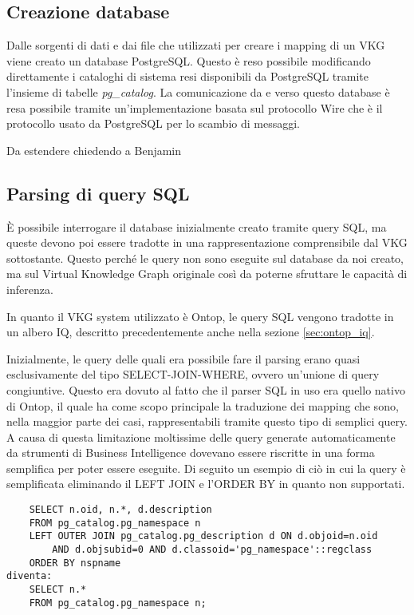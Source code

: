 \subsection{Creazione database}
\label{sec:bi-connector_db}
Dalle sorgenti di dati e dai file che utilizzati per creare i mapping di un VKG viene creato un database PostgreSQL.
Questo è reso possibile modificando direttamente i cataloghi di sistema resi disponibili da PostgreSQL tramite l'insieme di tabelle \textit{pg\_catalog}.
La comunicazione da e verso questo database è resa possibile tramite un'implementazione basata sul protocollo Wire che è il protocollo usato da PostgreSQL per lo scambio di messaggi.

Da estendere chiedendo a Benjamin

\subsection{Parsing di query SQL}
\label{sec:bi-connector_parsing}
\`E possibile interrogare il database inizialmente creato tramite query SQL, ma queste devono poi essere tradotte in una rappresentazione comprensibile dal VKG sottostante. Questo perché le query non sono eseguite sul database da noi creato, ma sul
Virtual Knowledge Graph originale così da poterne sfruttare le capacità di inferenza.

In quanto il VKG system utilizzato è Ontop, le query SQL vengono tradotte in un albero IQ, descritto precedentemente anche nella sezione \ref{sec:ontop_iq}.

Inizialmente, le query delle quali era possibile fare il parsing erano quasi esclusivamente del tipo SELECT-JOIN-WHERE, ovvero un'unione di query congiuntive. Questo era dovuto al fatto che il parser SQL in uso era quello nativo di Ontop,
il quale ha come scopo principale la traduzione dei mapping che sono, nella maggior parte dei casi, rappresentabili tramite questo tipo di semplici query.
A causa di questa limitazione moltissime delle query generate automaticamente da strumenti di Business Intelligence dovevano essere riscritte in una forma semplifica per poter essere eseguite.
Di seguito un esempio di ciò in cui la query è semplificata eliminando il LEFT JOIN e l'ORDER BY in quanto non supportati.
\begin{verbatim}
    SELECT n.oid, n.*, d.description 
    FROM pg_catalog.pg_namespace n
    LEFT OUTER JOIN pg_catalog.pg_description d ON d.objoid=n.oid 
        AND d.objsubid=0 AND d.classoid='pg_namespace'::regclass
    ORDER BY nspname
diventa:
    SELECT n.* 
    FROM pg_catalog.pg_namespace n;
\end{verbatim}

